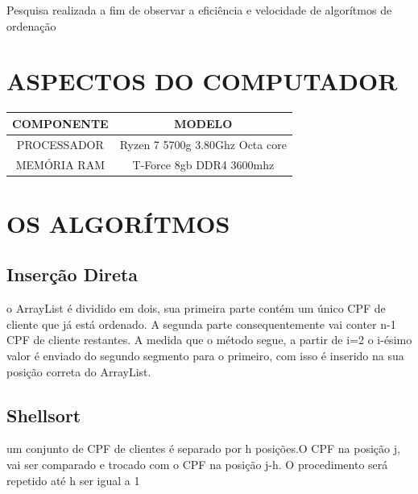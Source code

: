 \documentclass[12pt, a4paper]{FAESATeX}
\begin{document}
    \capa
     \sumario

    \begin{introducao}
        Pesquisa realizada a fim de observar a eficiência e velocidade de algorítmos de ordenação
    \end{introducao}


    \section{ASPECTOS DO COMPUTADOR}
    \begin{center}
        \begin{tabular}{|c|c|}
            \hline
            \textbf{COMPONENTE}  & \textbf{MODELO} \\
            \hline
            PROCESSADOR & Ryzen 7 5700g 3.80Ghz Octa core \\
            MEMÓRIA RAM & T-Force 8gb DDR4 3600mhz\\
            \hline
        \end{tabular}
    \end{center}

    \section{OS ALGORÍTMOS}

    \subsection*{Inserção Direta}
    o ArrayList é dividido em dois, sua primeira parte contém
    um único CPF de cliente que já está ordenado. A segunda parte
    consequentemente vai conter n-1 CPF de cliente restantes. A medida que o
    método segue, a partir de i=2 o i-ésimo valor é enviado do segundo segmento
    para o primeiro, com isso é inserido na sua posição correta do ArrayList.


    \subsection*{Shellsort}
    um conjunto de CPF de clientes é separado por h posições.O CPF na posição j,
    vai ser comparado e trocado com o CPF na posição j-h. O procedimento será
    repetido até h ser igual a 1
\end{document}

